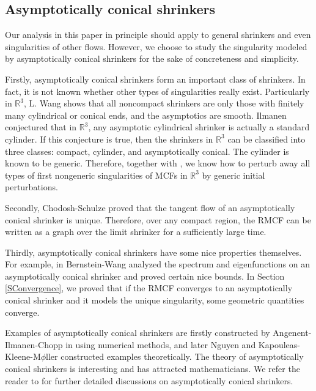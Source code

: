 \documentclass[12pt]{amsart}
\numberwithin{equation}{section}
\numberwithin{equation}{section}
\newcommand{\R}{\mathbb{R}}
\begin{document}
	
	\subsection{Asymptotically conical shrinkers}
	
	Our analysis in this paper in principle should apply to general shrinkers and even singularities of other flows. However, we choose to study the singularity modeled by asymptotically conical shrinkers for the sake of concreteness and simplicity. 
	
	Firstly, asymptotically conical shrinkers form an important class of shrinkers. In fact, it is not known whether other types of singularities really exist. Particularly in $\R^3$, L. Wang \cite{Wa2} shows that all noncompact shrinkers are only those with finitely many cylindrical or conical ends, and the asymptotics are smooth. Ilmanen \cite{I} conjectured that in $\R^3$, any asymptotic cylindrical shrinker is actually a standard cylinder. If this conjecture is true, then the shrinkers in $\R^3$ can be classified into three classes: compact, cylinder, and asymptotically conical. The cylinder is known to be generic. Therefore, together with \cite{SX}, we know how to perturb away all types of first nongeneric singularities of MCFs in $\R^3$ by generic initial perturbations.
	
	Secondly, Chodosh-Schulze \cite{CS} proved that the tangent flow of an asymptotically conical shrinker is unique. Therefore, over any compact region, the RMCF can be written as a graph over the limit shrinker for a sufficiently large time. 
	
	Thirdly, asymptotically conical shrinkers have some nice properties themselves. For example, in \cite{BW} Bernstein-Wang analyzed the spectrum and eigenfunctions on an asymptotically conical shrinker and proved certain nice bounds. In Section \ref{SConvergence}, we proved that if the RMCF converges to an asymptotically conical shrinker and it models the unique singularity, some geometric quantities converge.
	
	
	
	Examples of asymptotically conical shrinkers are firstly constructed by Angenent-Ilmanen-Chopp in \cite{AIC} using numerical methods, and later Nguyen \cite{Ngu} and Kapouleas-Kleene-M$\phi$ller \cite{KKM} constructed examples theoretically. The theory of asymptotically conical shrinkers is interesting and has attracted mathematicians. 
	We refer the reader to \cite{BW} for further detailed discussions on asymptotically conical shrinkers. 
	
\end{document}
